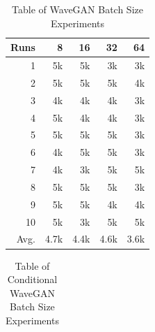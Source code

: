 \documentclass[a4paper, titlepage]{article}
\begin{document}
\begin{appendices}
\begin{table}[ht]
\begin{center}
\begin{tabular}{ r | r | r }
      \end{tabular}
    \end{center}
    
  \end{table}

  \begin{table}[ht]
    
    \caption{Table of WaveGAN Batch Size Experiments}
    \label{tab:WGAN_BS}
    
    \begin{center}
      \begin{tabular}{ r | r | r | r | r }
        
        Runs & 8 & 16 & 32 & 64 \\
        \hline
        1 & 5k & 5k & 3k & 3k \\
        2 & 5k & 5k & 5k & 4k \\
        3 & 4k & 4k & 4k & 3k \\
        4 & 5k & 4k & 4k & 3k \\
        5 & 5k & 5k & 5k & 3k \\
        6 & 4k & 5k & 5k & 3k \\
        7 & 4k & 3k & 5k & 5k \\
        8 & 5k & 5k & 5k & 3k \\
        9 & 5k & 5k & 4k & 4k \\
        10 & 5k & 3k & 5k & 5k \\
        \hline
        Avg. & 4.7k & 4.4k & 4.6k & 3.6k \\
        
      \end{tabular}
    \end{center}
    
  \end{table}

  \begin{table}[ht]
    
    \caption{Table of Conditional WaveGAN Batch Size Experiments}
    \label{tab:CWGAN_BS}
    
    \begin{center}
      \begin{tabular}{ r | r | r | r | r }
        

\end{tabular}
\end{center}
\end{table}
\end{appendices}
\end{document}
